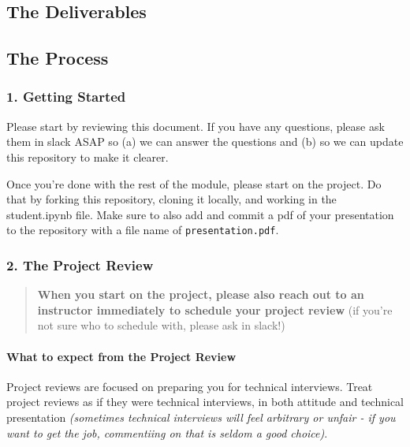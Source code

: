 \documentclass[11pt]{article}
\begin{document}
\hypertarget{the-deliverables}{%
\subsection{The Deliverables}\label{the-deliverables}}

    \hypertarget{the-process}{%
\subsection{The Process}\label{the-process}}

\hypertarget{getting-started}{%
\subsubsection{1. Getting Started}\label{getting-started}}

Please start by reviewing this document. If you have any questions,
please ask them in slack ASAP so (a) we can answer the questions and (b)
so we can update this repository to make it clearer.

Once you're done with the rest of the module, please start on the
project. Do that by forking this repository, cloning it locally, and
working in the student.ipynb file. Make sure to also add and commit a
pdf of your presentation to the repository with a file name of
\texttt{presentation.pdf}.

\hypertarget{the-project-review}{%
\subsubsection{2. The Project Review}\label{the-project-review}}

\begin{quote}
\textbf{When you start on the project, please also reach out to an
instructor immediately to schedule your project review} (if you're not
sure who to schedule with, please ask in slack!)
\end{quote}

\hypertarget{what-to-expect-from-the-project-review}{%
\paragraph{What to expect from the Project
Review}\label{what-to-expect-from-the-project-review}}

Project reviews are focused on preparing you for technical interviews.
Treat project reviews as if they were technical interviews, in both
attitude and technical presentation \emph{(sometimes technical
interviews will feel arbitrary or unfair - if you want to get the job,
commentiing on that is seldom a good choice)}.
\end{document}
